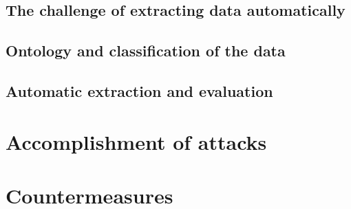 \subsection{The challenge of extracting data automatically}
\subsection{Ontology and classification of the data}
\subsection{Automatic extraction and evaluation}

\section{Accomplishment of attacks}

\section{Countermeasures}
